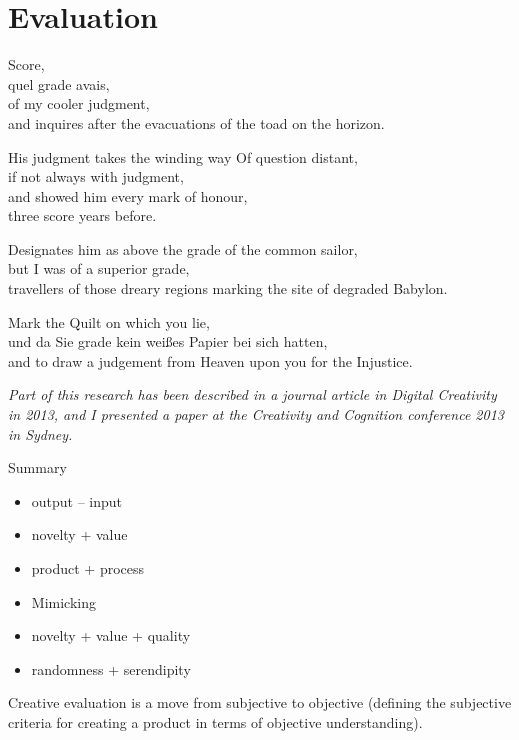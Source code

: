 
\chapter{Evaluation}
\label{ch:evaluation}

\startcontents[chapters]

Score, \\
quel grade avais, \\
of my cooler judgment, \\
and inquires after the evacuations of the toad on the horizon.

His judgment takes the winding way Of question distant, \\
if not always with judgment, \\
and showed him every mark of honour, \\
three score years before.

Designates him as above the grade of the common sailor, \\
but I was of a superior grade, \\
travellers of those dreary regions marking the site of degraded Babylon.

Mark the Quilt on which you lie, \\
und da Sie grade kein weißes Papier bei sich hatten, \\
and to draw a judgement from Heaven upon you for the Injustice.

\minicontents

\emph{Part of this research has been described in a journal article in Digital Creativity in 2013, and I presented a paper at the Creativity and Cognition conference 2013 in Sydney.}

\grule %

\begin{shaded}
  Summary
  \begin{itemize}
  \item output – input
  \item novelty + value
  \item product + process
  \item Mimicking
  \item novelty + value + quality
  \item randomness + serendipity
  \end{itemize}
\end{shaded}

\begin{draft}
  Creative evaluation is a move from subjective to objective (defining the subjective criteria for creating a product in terms of objective understanding).
\end{draft}

